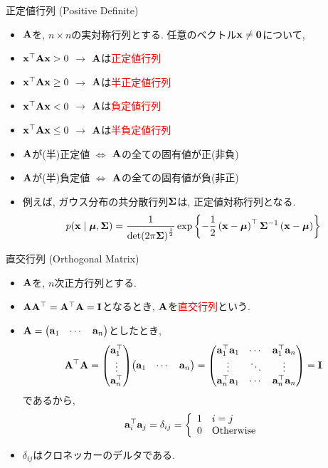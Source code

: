 \documentclass[dvipdfmx,notheorems,t]{beamer}
\begin{document}
\begin{frame}{正定値行列 (Positive Definite)}
\begin{itemize}
  \item $\vb{A}$を, $n \times n$の実対称行列とする. 任意のベクトル$\vb{x} \neq \vb{0}$について,
  \item $\vb{x}^\top \vb{A} \vb{x} > 0$ $\to$ $\vb{A}$は\textcolor{red}{正定値行列}
  \item $\vb{x}^\top \vb{A} \vb{x} \ge 0$ $\to$ $\vb{A}$は\textcolor{red}{半正定値行列}
  \item $\vb{x}^\top \vb{A} \vb{x} < 0$ $\to$ $\vb{A}$は\textcolor{red}{負定値行列}
  \item $\vb{x}^\top \vb{A} \vb{x} \le 0$ $\to$ $\vb{A}$は\textcolor{red}{半負定値行列}
  \item $\vb{A}$が(半)正定値 $\Longleftrightarrow$ $\vb{A}$の全ての固有値が正(非負)
  \item $\vb{A}$が(半)負定値 $\Longleftrightarrow$ $\vb{A}$の全ての固有値が負(非正)
  \item 例えば, ガウス分布の共分散行列$\vb{\Sigma}$は, 正定値対称行列となる.
  $$p(\vb{x} \mid \vb*{\mu}, \vb{\Sigma}) = \frac{1}{\det(2 \pi \vb{\Sigma})^\frac{1}{2}}
    \exp\left\{ -\frac{1}{2} \left( \vb{x} - \vb*{\mu} \right)^\top \vb{\Sigma}^{-1}
    \left( \vb{x} - \vb*{\mu} \right) \right\}$$
\end{itemize}
\end{frame}

\begin{frame}{直交行列 (Orthogonal Matrix)}
\begin{itemize}
  \item $\vb{A}$を, $n$次正方行列とする.
  \item $\vb{A} \vb{A}^\top = \vb{A}^\top \vb{A} = \vb{I}$となるとき, $\vb{A}$を\textcolor{red}{直交行列}という.
  \item $\vb{A} = \mqty(\vb{a}_1 & \cdots & \vb{a}_n)$としたとき,
  $$\vb{A}^\top \vb{A}
    = \mqty(\vb{a}_1^\top \\ \vdots \\ \vb{a}_n^\top) \mqty(\vb{a}_1 & \cdots & \vb{a}_n)
    = \mqty(\vb{a}_1^\top \vb{a}_1 & \cdots & \vb{a}_1^\top \vb{a}_n \\
      \vdots & \ddots & \vdots \\
      \vb{a}_n^\top \vb{a}_1 & \cdots & \vb{a}_n^\top \vb{a}_n) = \vb{I}$$
  であるから,
  $$\vb{a}_i^\top \vb{a}_j = \delta_{ij} = \left\{ \begin{array}{ll}
    1 & i = j \\ 0 & \text{Otherwise} \end{array} \right.$$
  \item $\delta_{ij}$はクロネッカーのデルタである.
\end{itemize}
\end{frame}
\end{document}
